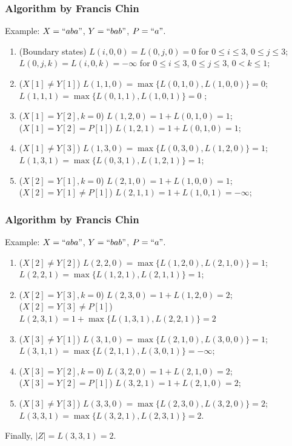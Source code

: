 \documentclass[10pt]{beamer}
\begin{document}
\begin{frame}
  \frametitle{Algorithm by Francis Chin}
  Example: $X=``aba"$, $Y=``bab"$, $P=``a"$.

  \begin{enumerate}
  \item<2-> (Boundary states) $L(i,0,0)=L(0,j,0)=0$ for $0\le i\le 3$, $0\le j\le 3$;
    $L(0, j, k)=L(i,0,k)=-\infty$ for $0\le i\le 3$, $0\le j\le 3$, $0<k\le1$;
  \item<3-> ($X[1]\neq Y[1]$) $L(1,1,0)=\max\{L(0,1,0), L(1,0,0)\}=0$;\\
    $L(1,1,1)=\max\{L(0,1,1), L(1,0,1)\}=0$ ;
  \item<4-> ($X[1]=Y[2], k=0$) $L(1,2,0)=1+L(0,1,0)=1$;\\
    ($X[1]=Y[2]=P[1]$) $L(1,2,1)=1+L(0,1,0)=1$;
  \item<5-> ($X[1]\neq Y[3]$) $L(1,3,0)=\max\{L(0,3,0), L(1,2,0)\} = 1$;\\ $L(1,3,1)=\max\{L(0,3,1), L(1,2,1)\}=1$;
  \item<6-> ($X[2]=Y[1], k=0$) $L(2,1,0) = 1+ L(1,0,0) = 1$; \\
    ($X[2]=Y[1]\neq P[1]$) $L(2,1,1)=1+L(1,0,1)=-\infty$;
  \end{enumerate}
\end{frame}

\begin{frame}
  \frametitle{Algorithm by Francis Chin}
  Example: $X=``aba"$, $Y=``bab"$, $P=``a"$.

  \begin{enumerate}
  \addtocounter{enumi}{5}
  \item<2-> ($X[2]\neq Y[2]$) $L(2,2,0) = \max\{L(1,2,0), L(2,1,0)\}=1$;\\ $L(2,2,1)=\max\{L(1,2,1),L(2,1,1)\}=1$;
  \item<3-> ($X[2]=Y[3], k=0$) $L(2,3,0)=1+L(1,2,0) = 2$; \\
    ($X[2]=Y[3]\neq P[1]$) $L(2,3,1) =1+\max\{L(1,3,1),L(2,2,1)\}=2$
  \item<4-> ($X[3]\neq Y[1]$) $L(3,1,0)=\max\{L(2,1,0), L(3,0,0)\}=1$;\\ $L(3,1,1)=\max\{L(2,1,1), L(3,0,1)\}=-\infty$;
  \item<5-> ($X[3]=Y[2], k=0$) $L(3,2,0)=1+ L(2,1,0) = 2$;\\
    ($X[3]=Y[2]=P[1]$) $L(3,2,1)=1+L(2,1,0) = 2$;
  \item<6-> ($X[3]\neq Y[3]$) $L(3,3,0) = \max\{L(2,3,0), L(3,2,0)\} = 2$;\\ $L(3,3,1) = \max\{L(3,2,1), L(2,3,1)\}=2$.
  \end{enumerate}

  \pause\pause\pause\pause\pause\pause
  Finally, $|Z|=L(3,3,1)=2$.

\end{frame}
\end{document}

